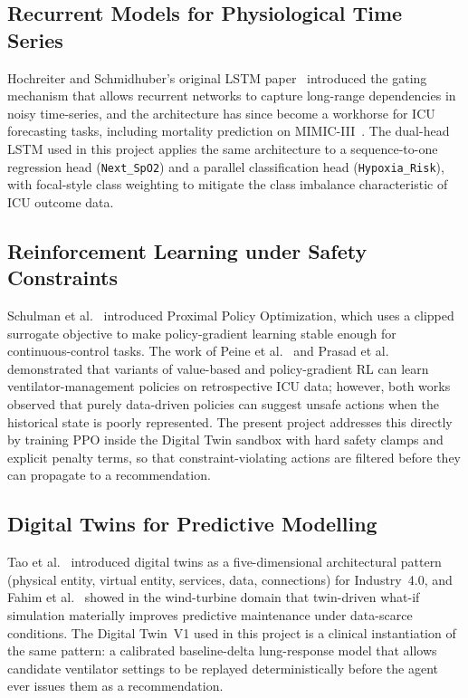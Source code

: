 \documentclass[12pt,a4paper,oneside]{report}
\begin{document}
\subsection{Recurrent Models for Physiological Time Series}
Hochreiter and Schmidhuber's original LSTM paper~\cite{hochreiter1997} introduced the gating mechanism that allows recurrent networks to capture long-range dependencies in noisy time-series, and the architecture has since become a workhorse for ICU forecasting tasks, including mortality prediction on MIMIC-III~\cite{johnson2016}. The dual-head LSTM used in this project applies the same architecture to a sequence-to-one regression head (\texttt{Next\_SpO2}) and a parallel classification head (\texttt{Hypoxia\_Risk}), with focal-style class weighting to mitigate the class imbalance characteristic of ICU outcome data.

\subsection{Reinforcement Learning under Safety Constraints}
Schulman et al.~\cite{schulman2017} introduced Proximal Policy Optimization, which uses a clipped surrogate objective to make policy-gradient learning stable enough for continuous-control tasks. The work of Peine et al.~\cite{peine2021} and Prasad et al.~\cite{prasad2017} demonstrated that variants of value-based and policy-gradient RL can learn ventilator-management policies on retrospective ICU data; however, both works observed that purely data-driven policies can suggest unsafe actions when the historical state is poorly represented. The present project addresses this directly by training PPO inside the Digital Twin sandbox with hard safety clamps and explicit penalty terms, so that constraint-violating actions are filtered before they can propagate to a recommendation.

\subsection{Digital Twins for Predictive Modelling}
Tao et al.~\cite{tao2018} introduced digital twins as a five-dimensional architectural pattern (physical entity, virtual entity, services, data, connections) for Industry~4.0, and Fahim et al.~\cite{fahim2022} showed in the wind-turbine domain that twin-driven what-if simulation materially improves predictive maintenance under data-scarce conditions. The Digital Twin~V1 used in this project is a clinical instantiation of the same pattern: a calibrated baseline-delta lung-response model that allows candidate ventilator settings to be replayed deterministically before the agent ever issues them as a recommendation.
\end{document}
